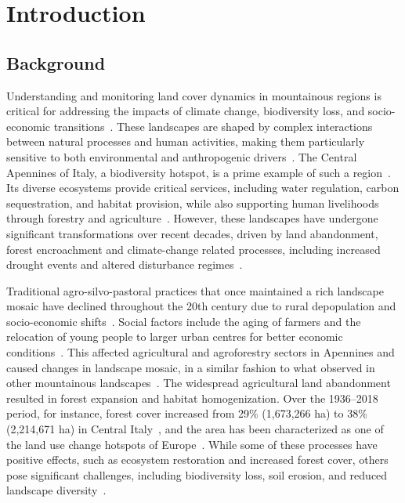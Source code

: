 \documentclass[jimaging,article,accept,pdftex,oneauthor]{Definitions/mdpi}
\begin{document}
\section{Introduction}
\subsection{Background}

Understanding and monitoring land cover dynamics in mountainous regions is critical for addressing the impacts of climate change, biodiversity loss, and socio-economic transitions~\cite{VACCHIANO201757,BENGTSSON200039}. These landscapes are shaped by complex interactions between natural processes and human activities, making them particularly sensitive to both environmental and anthropogenic drivers~\cite{LASANTA2017810,data7060074,BEBI201743}. The Central Apennines of Italy, a biodiversity hotspot, is a prime example of such a region~\cite{Ogwu2024}. Its diverse ecosystems provide critical services, including water regulation, carbon sequestration, and habitat provision, while also supporting human livelihoods through forestry and agriculture~\cite{VACCHIANO201757}. However, these landscapes have undergone significant transformations over recent decades, driven by land abandonment, forest encroachment and climate-change related processes, including increased drought events and altered disturbance regimes~\cite{SEBASTIANI2024101329,Vitali,BEBI201743}.

Traditional agro-silvo-pastoral practices that once maintained a rich landscape mosaic have declined throughout the 20th century due to rural depopulation and socio-economic shifts~\cite{Vitali}. Social factors include the aging of farmers and the relocation of young people to larger urban centres for better economic conditions~\cite{MAREGGI2024103358,BRUNORI2007183}. This affected agricultural and agroforestry sectors in Apennines and caused changes in landscape mosaic, in a similar fashion to what observed in other mountainous landscapes~\cite{LASANTA2017810,PERPINACASTILLO2021104946,geomatics5010005,Arnaez}. The widespread agricultural land abandonment resulted in forest expansion and habitat homogenization. Over the 1936--2018 period, for instance, forest cover increased from 29\% (1,673,266 %
 ha) to 38\% (2,214,671 ha) in Central Italy~\cite{AGNOLETTI2022119655}, and the area has been characterized as one of the land use change hotspots of Europe~\cite{Kuemmerle_2016}. While some of these processes have positive effects, such as ecosystem restoration and increased forest cover, others pose significant challenges, including biodiversity loss, soil erosion, and reduced landscape diversity~\cite{Falcucci,AMEZTEGUI2021104240}.
\end{document}
